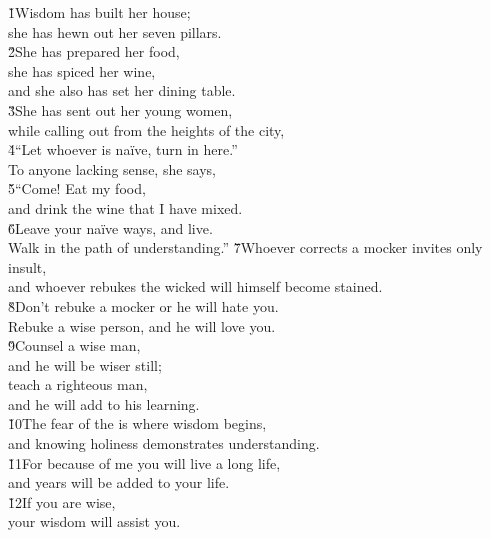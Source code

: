 \begin{poetry}
\poeml {}
\v{1}Wisdom has built her house; \\
\poeml she has hewn out her seven pillars. \\
\poeml \v{2}She has prepared her food, \\
\poemll    she has spiced her wine, \\
\poemlll       and she also has set her dining table. \\
\poeml \v{3}She has sent out her young women, \\
\poemll    while calling out from the heights of the city, \\
\poeml \v{4}``Let whoever is na\"{i}ve, turn in here.'' \\
\poemll    To anyone lacking sense, she says, \\
\poeml \v{5}``Come! Eat my food, \\
\poemll    and drink the wine that I have mixed. \\
\poeml \v{6}Leave your na\"{i}ve ways, and live. \\
\poemll    Walk in the path of understanding.''
\poeml \v{7}Whoever corrects a mocker invites only insult, \\
\poemll    and whoever rebukes the wicked will himself become stained. \\
\poeml \v{8}Don't rebuke a mocker or he will hate you. \\
\poemll    Rebuke a wise person, and he will love you. \\
\poeml \v{9}Counsel a wise man, \\
\poemll    and he will be wiser still; \\
\poeml teach a righteous man, \\
\poemll    and he will add to his learning. \\
\poeml \v{10}The fear of the  is where wisdom begins, \\
\poemll    and knowing holiness demonstrates understanding. \\
\poeml \v{11}For because of me you will live a long life, \\
\poemll    and years will be added to your life. \\
\poeml \v{12}If you are wise, \\
\poemll    your wisdom will assist you. \\

\end{poetry}
